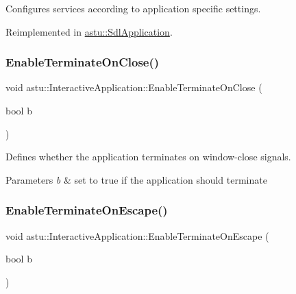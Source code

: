 Configures services according to application specific settings. 

Reimplemented in \hyperlink{classastu_1_1SdlApplication_af309f097b9ec604101d9c0cbd66e8ba1}{astu\+::\+Sdl\+Application}.

\mbox{\label{classastu_1_1InteractiveApplication_aedaf9f10e1b285aa3afd68c0676c2be7}} 
\subsubsection{\texorpdfstring{Enable\+Terminate\+On\+Close()}{EnableTerminateOnClose()}}
{\footnotesize\ttfamily void astu\+::\+Interactive\+Application\+::\+Enable\+Terminate\+On\+Close (\begin{DoxyParamCaption}\item[{bool}]{b }\end{DoxyParamCaption})}

Defines whether the application terminates on window-\/close signals.


\begin{DoxyParams}{Parameters}
{\em b} & set to {\ttfamily true} if the application should terminate \\
\hline
\end{DoxyParams}
\mbox{\label{classastu_1_1InteractiveApplication_abbec05442efadd10dbef963efb6d694a}} 
\subsubsection{\texorpdfstring{Enable\+Terminate\+On\+Escape()}{EnableTerminateOnEscape()}}
{\footnotesize\ttfamily void astu\+::\+Interactive\+Application\+::\+Enable\+Terminate\+On\+Escape (\begin{DoxyParamCaption}\item[{bool}]{b }\end{DoxyParamCaption})}


